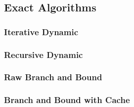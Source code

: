 \subsection{Exact Algorithms}
\subsubsection{Iterative Dynamic}
\subsubsection{Recursive Dynamic}
\subsubsection{Raw Branch and Bound}
\subsubsection{Branch and Bound with Cache}
